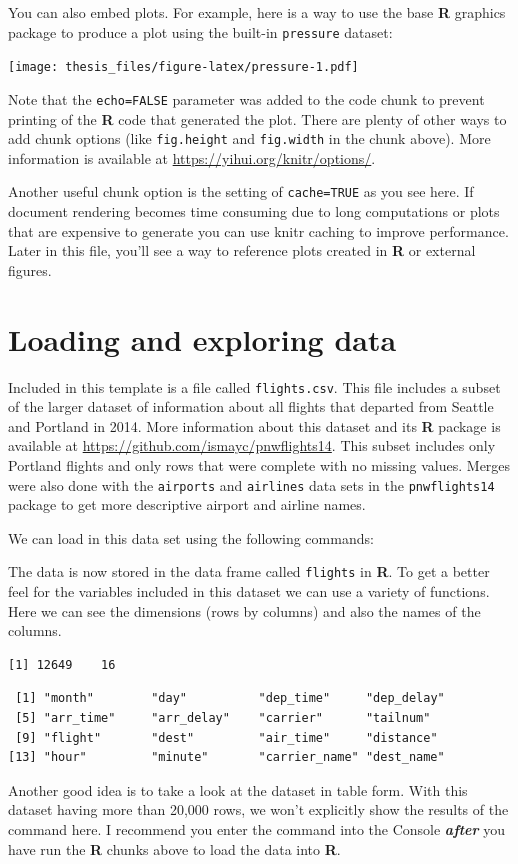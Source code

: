 \documentclass[12pt,twoside]{reedthesis}
\begin{document}
You can also embed plots. For example, here is a way to use the base \textbf{R} graphics package to produce a plot using the built-in \texttt{pressure} dataset:

\texttt{[image: thesis\_files/figure-latex/pressure-1.pdf]}

Note that the \texttt{echo=FALSE} parameter was added to the code chunk to prevent printing of the \textbf{R} code that generated the plot. There are plenty of other ways to add chunk options (like \texttt{fig.height} and \texttt{fig.width} in the chunk above). More information is available at \url{https://yihui.org/knitr/options/}.

Another useful chunk option is the setting of \texttt{cache=TRUE} as you see here. If document rendering becomes time consuming due to long computations or plots that are expensive to generate you can use knitr caching to improve performance. Later in this file, you'll see a way to reference plots created in \textbf{R} or external figures.

\hypertarget{loading-and-exploring-data}{%
\section{Loading and exploring data}\label{loading-and-exploring-data}}

Included in this template is a file called \texttt{flights.csv}. This file includes a subset of the larger dataset of information about all flights that departed from Seattle and Portland in 2014. More information about this dataset and its \textbf{R} package is available at \url{https://github.com/ismayc/pnwflights14}. This subset includes only Portland flights and only rows that were complete with no missing values. Merges were also done with the \texttt{airports} and \texttt{airlines} data sets in the \texttt{pnwflights14} package to get more descriptive airport and airline names.

We can load in this data set using the following commands:

The data is now stored in the data frame called \texttt{flights} in \textbf{R}. To get a better feel for the variables included in this dataset we can use a variety of functions. Here we can see the dimensions (rows by columns) and also the names of the columns.
\begin{verbatim}
[1] 12649    16
\end{verbatim}
\begin{verbatim}
 [1] "month"        "day"          "dep_time"     "dep_delay"   
 [5] "arr_time"     "arr_delay"    "carrier"      "tailnum"     
 [9] "flight"       "dest"         "air_time"     "distance"    
[13] "hour"         "minute"       "carrier_name" "dest_name"   
\end{verbatim}
Another good idea is to take a look at the dataset in table form. With this dataset having more than 20,000 rows, we won't explicitly show the results of the command here. I recommend you enter the command into the Console \textbf{\emph{after}} you have run the \textbf{R} chunks above to load the data into \textbf{R}.
\end{document}
